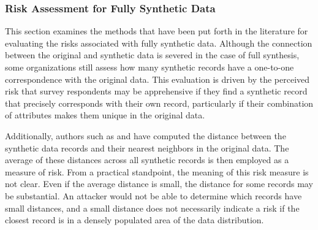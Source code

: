 \subsubsection{Risk Assessment for Fully Synthetic Data}
\label{subsubsec:riskfullsyn}
This section examines the methods that have been put forth in the literature for evaluating the risks associated with fully synthetic data. Although the connection between the original and synthetic data is severed in the case of full synthesis, some organizations still assess how many synthetic records have a one-to-one correspondence with the original data. This evaluation is driven by the perceived risk that survey respondents may be apprehensive if they find a synthetic record that precisely corresponds with their own record, particularly if their combination of attributes makes them unique in the original data.

Additionally, authors such as \citet{park2018data} and \citet{zhao2021ctab} have computed the distance between the synthetic data records and their nearest neighbors in the original data. The average of these distances across all synthetic records is then employed as a measure of risk. From a practical standpoint, the meaning of this risk measure is not clear. Even if the average distance is small, the distance for some records may be substantial. An attacker would not be able to determine which records have small distances, and a small distance does not necessarily indicate a risk if the closest record is in a densely populated area of the data distribution.

